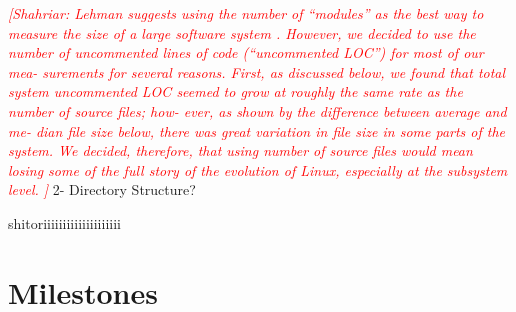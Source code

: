 \documentclass[conference]{IEEEtran}
\newcommand{\shahriar}[1]{\textcolor{red}{{\it [Shahriar: #1]}}}
\begin{document}
	\shahriar{Lehman suggests using the number of “modules” as the best way to measure the size of a large software system \cite{637156}. However, we decided to use the number of uncommented lines of code (“uncommented LOC”) for most of our mea- surements for several reasons. First, as discussed below, we found that total system uncommented LOC seemed to grow at roughly the same rate as the number of source files; how- ever, as shown by the difference between average and me- dian file size below, there was great variation in file size in some parts of the system. We decided, therefore, that using number of source files would mean losing some of the full story of the evolution of Linux, especially at the subsystem level. \cite{883030}
	}
	2- Directory Structure?
	
	
	
	shitoriiiiiiiiiiiiiiiiiiii
	
	
	\label{sec:rq}
	
	\section{Milestones}
	
	
	
\end{document}
